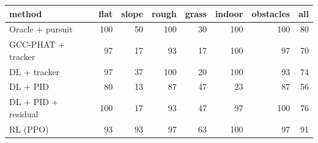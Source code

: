 \begin{tabular}{lrrrrrrr}
\toprule
method & flat & slope & rough & grass & indoor & obstacles & all\\
\midrule
Oracle + pursuit & 100 & 50 & 100 & 30 & 100 & 100 & 80 \\
GCC-PHAT + tracker & 97 & 17 & 93 & 17 & 100 & 97 & 70 \\
DL + tracker & 97 & 37 & 100 & 20 & 100 & 93 & 74 \\
DL + PID & 80 & 13 & 87 & 47 & 23 & 87 & 56 \\
DL + PID + residual & 100 & 17 & 93 & 47 & 97 & 100 & 76 \\
RL (PPO) & 93 & 93 & 97 & 63 & 100 & 97 & 91 \\
\bottomrule
\end{tabular}
